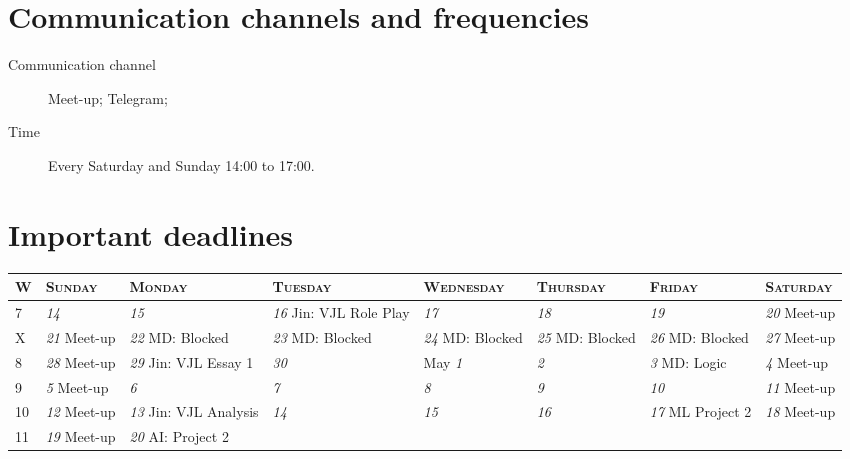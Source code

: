 \documentclass{article}
\newcommand{\dy}[1]{\hfill \textit{\large #1}}
\begin{document}
\section*{Communication channels and frequencies}
\begin{description}
    \item [Communication channel] Meet-up; Telegram;
    \item [Time] Every Saturday and Sunday 14:00 to 17:00.
\end{description}
\section*{Important deadlines}
\begin{tabularx}{\textwidth}{| l | X | X | X | X | X | X | X |}
    \hline
    W & \textsc{Sunday} & \textsc{Monday} & \textsc{Tuesday} & \textsc{Wednesday} & \textsc{Thursday} & \textsc{Friday} & \textsc{Saturday} \\
    \hline \hline 
    7 & \dy{14} & \dy{15} & \dy{16} \newline Jin: VJL Role Play & \dy{17} & \dy{18} & \dy{19} & \dy{20} \newline Meet-up \\ \hline
    X & \dy{21} \newline Meet-up & \dy{22} \newline MD: Blocked & \dy{23} \newline MD: Blocked & \dy{24} \newline MD: Blocked & \dy{25} \newline MD: Blocked & \dy{26} \newline MD: Blocked  & \dy{27} \newline Meet-up \\ \hline
    8 & \dy{28} \newline Meet-up & \dy{29} \newline Jin: VJL Essay 1 & \dy{30} & May \dy{1} & \dy{2} & \dy{3} \newline MD: Logic & \dy{4} \newline Meet-up \\ \hline
    9 & \dy{5} \newline Meet-up & \dy{6} & \dy{7} & \dy{8} & \dy{9} & \dy{10} & \dy{11} \newline Meet-up \\ \hline
    10 & \dy{12} \newline Meet-up & \dy{13} \newline Jin: VJL Analysis & \dy{14} & \dy{15} & \dy{16} & \dy{17} \newline ML Project 2 & \dy{18} \newline Meet-up \\ \hline
    11 & \dy{19} \newline Meet-up & \dy{20} \newline AI: Project 2 & & & & & \\
    \hline
\end{tabularx}
\end{document}
